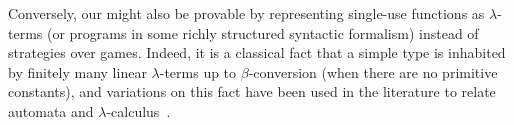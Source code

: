 \documentclass[a4paper,UKenglish,cleveref, autoref, thm-restate]{lipics-v2021}
\begin{document}
Conversely, our  might also be provable by representing single-use functions as $\lambda$-terms (or programs in some richly structured syntactic formalism) instead of strategies over games. Indeed, it is a classical fact that a simple type is inhabited by finitely many linear $\lambda$-terms up to $\beta$-conversion (when there are no primitive constants), and variations on this fact have been used in the literature to relate automata and $\lambda$-calculus~\cite{IATLC,LambdaTransducer}.



\end{document}
